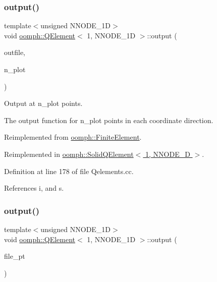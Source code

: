 \subsubsection{\texorpdfstring{output()}{output()}\hspace{0.1cm}{\footnotesize\ttfamily [2/4]}}
{\footnotesize\ttfamily template$<$unsigned N\+N\+O\+D\+E\+\_\+1D$>$ \\
void \hyperlink{classoomph_1_1QElement}{oomph\+::\+Q\+Element}$<$ 1, N\+N\+O\+D\+E\+\_\+1D $>$\+::output (\begin{DoxyParamCaption}\item[{std\+::ostream \&}]{outfile,  }\item[{const unsigned \&}]{n\+\_\+plot }\end{DoxyParamCaption})\hspace{0.3cm}{\ttfamily [virtual]}}



Output at n\+\_\+plot points. 

The output function for n\+\_\+plot points in each coordinate direction. 

Reimplemented from \hyperlink{classoomph_1_1FiniteElement_afa9d9b2670f999b43e6679c9dd28c457}{oomph\+::\+Finite\+Element}.



Reimplemented in \hyperlink{classoomph_1_1SolidQElement_3_011_00_01NNODE__1D_01_4_af9949cdad7c4cd1a8a9c50385d00ce7f}{oomph\+::\+Solid\+Q\+Element$<$ 1, N\+N\+O\+D\+E\+\_\+D $>$}.



Definition at line 178 of file Qelements.\+cc.



References i, and s.

\mbox{\label{classoomph_1_1QElement_3_011_00_01NNODE__1D_01_4_a54d62722411a1b5361718aa95f6c4e70}} 
\subsubsection{\texorpdfstring{output()}{output()}\hspace{0.1cm}{\footnotesize\ttfamily [3/4]}}
{\footnotesize\ttfamily template$<$unsigned N\+N\+O\+D\+E\+\_\+1D$>$ \\
void \hyperlink{classoomph_1_1QElement}{oomph\+::\+Q\+Element}$<$ 1, N\+N\+O\+D\+E\+\_\+1D $>$\+::output (\begin{DoxyParamCaption}\item[{F\+I\+LE $\ast$}]{file\+\_\+pt }\end{DoxyParamCaption})\hspace{0.3cm}{\ttfamily [virtual]}}




